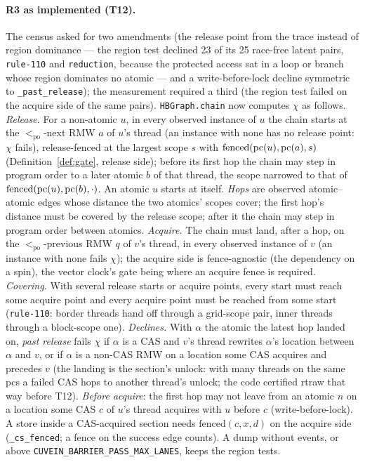 \documentclass[11pt]{article}
\theoremstyle{remark}
\newcommand{\PO}{<_{\mathrm{po}}}\newcommand{\HB}{\to_{\mathrm{hb}}}\newcommand{\HBr}{\trianglelefteq_{\mathrm{hb}}}
\begin{document}
\paragraph{R3 as implemented (T12).} The census asked for two amendments (the release point
from the trace instead of region dominance --- the region test declined 23 of its 25 race-free
latent pairs, \texttt{rule-110} and \texttt{reduction}, because the protected access sat in a
loop or branch whose region dominates no atomic --- and a write-before-lock decline symmetric
to \texttt{\_past\_release}); the measurement required a third (the region test failed on the
acquire side of the same pairs). \texttt{HBGraph.chain} now computes $\chi$ as follows.
\emph{Release.} For a non-atomic $u$, in every observed instance of $u$ the chain starts at
the $\PO$-next RMW $a$ of $u$'s thread (an instance with none has no release point: $\chi$
fails), release-fenced at the largest scope $s$ with $\mathrm{fenced}(\operatorname{pc}(u),\operatorname{pc}(a),s)$
(Definition~\ref{def:gate}, release side); before its first hop the chain may step in
program order to a later atomic $b$ of that thread, the scope narrowed to that of
$\mathrm{fenced}(\operatorname{pc}(u),\operatorname{pc}(b),\cdot)$. An atomic $u$ starts at itself. \emph{Hops} are observed
atomic--atomic edges whose distance the two atomics' scopes cover; the first hop's distance
must be covered by the release scope; after it the chain may step in program order between
atomics. \emph{Acquire.} The chain must land, after a hop, on the $\PO$-previous RMW $q$ of
$v$'s thread, in every observed instance of $v$ (an instance with none fails $\chi$); the
acquire side is fence-agnostic (the dependency on a spin), the vector clock's gate being where
an acquire fence is required. \emph{Covering.} With several release starts or acquire points,
every start must reach some acquire point and every acquire point must be reached from some
start (\texttt{rule-110}: border threads hand off through a grid-scope pair, inner threads
through a block-scope one). \emph{Declines.} With $\alpha$ the atomic the latest hop landed on,
\emph{past release} fails $\chi$ if $\alpha$ is a CAS and $v$'s thread rewrites $\alpha$'s
location between $\alpha$ and $v$, or if $\alpha$ is a non-CAS RMW on a location some CAS
acquires and precedes $v$ (the landing is the section's unlock: with many threads on the same
pcs a failed CAS hops to another thread's unlock; the code certified rtraw that way before
T12). \emph{Before acquire}: the first hop may not leave from an atomic $n$ on a location some
CAS $c$ of $u$'s thread acquires with $u$ before $c$ (write-before-lock). A store inside a
CAS-acquired section needs $\mathrm{fenced}(c,x,d)$ on the acquire side (\texttt{\_cs\_fenced};
a fence on the success edge counts). A dump without events, or above
\texttt{CUVEIN\_BARRIER\_PASS\_MAX\_LANES}, keeps the region tests.
\end{document}
